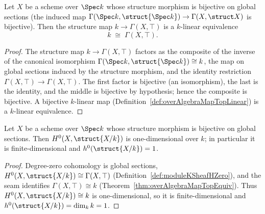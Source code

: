 \begin{theorem}
  \label{thm:overAlgebraMapTopEquiv}
  \leanok
  Let \(X\) be a scheme over \(\Spec k\) whose structure morphism is bijective on global sections
  (the induced map \(\Gamma(\Spec k, \struct{\Spec k}) \to \Gamma(X, \struct X)\) is bijective).
  Then the structure map \(k \to \Gamma(X, \top)\) is a \(k\)-linear equivalence
  \[
    k \;\cong\; \Gamma(X, \top).
  \]
\end{theorem}
\begin{proof}
  \leanok
  The structure map \(k \to \Gamma(X, \top)\) factors as the composite of the inverse of the
  canonical isomorphism \(\Gamma(\Spec k, \struct{\Spec k}) \cong k\), the map on global sections
  induced by the structure morphism, and the identity restriction \(\Gamma(X, \top) \to
  \Gamma(X, \top)\). The first factor is bijective (an isomorphism), the last is the identity,
  and the middle is bijective by hypothesis; hence the composite is bijective. A bijective
  \(k\)-linear map (Definition~\ref{def:overAlgebraMapTopLinear}) is a \(k\)-linear equivalence.
\end{proof}

\begin{theorem}[\(h^0 = 1\) when global sections are constant]
  \label{thm:h0_moduleKSheaf_bijective}
  \leanok
  Let \(X\) be a scheme over \(\Spec k\) whose structure morphism is bijective on global
  sections. Then \(H^0(X, \struct{X/k})\) is one-dimensional over \(k\); in particular it is
  finite-dimensional and \(h^0(\struct{X/k}) = 1\).
\end{theorem}
\begin{proof}
  \leanok
  Degree-zero cohomology is global sections, \(H^0(X, \struct{X/k}) \cong \Gamma(X, \top)\)
  (Definition~\ref{def:moduleKSheafHZero}), and the seam identifies \(\Gamma(X, \top) \cong k\)
  (Theorem~\ref{thm:overAlgebraMapTopEquiv}). Thus \(H^0(X, \struct{X/k}) \cong k\) is
  one-dimensional, so it is finite-dimensional and \(h^0(\struct{X/k}) = \dim_k k = 1\).
\end{proof}

